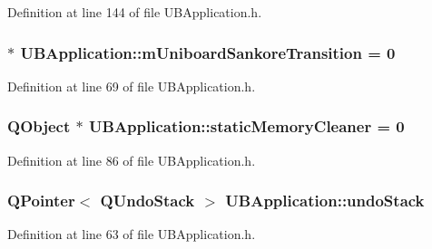Definition at line 144 of file U\-B\-Application.\-h.

\hypertarget{class_u_b_application_afa55ba32705fabaf0fd57d8b669ef552}{
\subsubsection[{m\-Uniboard\-Sankore\-Transition}]{ $\ast$ U\-B\-Application\-::m\-Uniboard\-Sankore\-Transition = 0\hspace{0.3cm}{\ttfamily [static]}}}\label{d8/d81/class_u_b_application_afa55ba32705fabaf0fd57d8b669ef552}


Definition at line 69 of file U\-B\-Application.\-h.

\hypertarget{class_u_b_application_af72d66aadc04a5b23e8ca42c0944273a}{
\subsubsection[{static\-Memory\-Cleaner}]{\setlength{\rightskip}{0pt plus 5cm}Q\-Object $\ast$ U\-B\-Application\-::static\-Memory\-Cleaner = 0\hspace{0.3cm}{\ttfamily [static]}}}\label{d8/d81/class_u_b_application_af72d66aadc04a5b23e8ca42c0944273a}


Definition at line 86 of file U\-B\-Application.\-h.

\hypertarget{class_u_b_application_a94e54cea75617b63d6cf97612430a77d}{
\subsubsection[{undo\-Stack}]{\setlength{\rightskip}{0pt plus 5cm}Q\-Pointer$<$ Q\-Undo\-Stack $>$ U\-B\-Application\-::undo\-Stack\hspace{0.3cm}{\ttfamily [static]}}}\label{d8/d81/class_u_b_application_a94e54cea75617b63d6cf97612430a77d}


Definition at line 63 of file U\-B\-Application.\-h.

